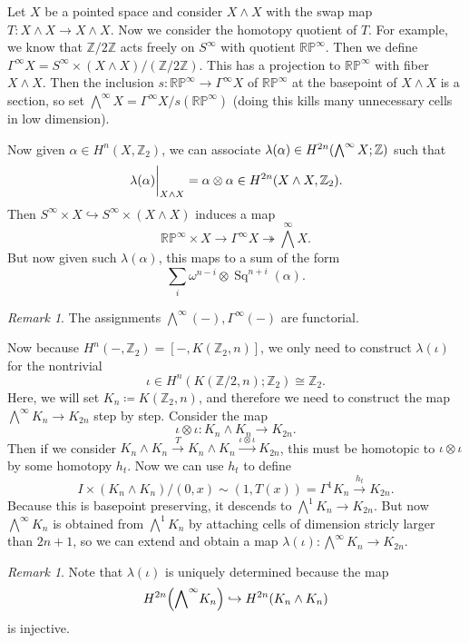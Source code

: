 \documentclass[leqno, openany]{memoir}
\theoremstyle{definition}
\theoremstyle{remark}
\newtheorem{rmk}[thm]{Remark}
\theoremstyle{plain}
\theoremstyle{definition}
\theoremstyle{remark}
\newcommand{\R}{\mathbb{R}}
\newcommand{\Z}{\mathbb{Z}}
\renewcommand{\P}{\mathbb{P}}
\DeclareMathOperator{\Sq}{Sq}
\begin{document}
Let $X$ be a pointed space and consider $X \wedge X$ with the swap map $T
\colon X \wedge X \to X \wedge X$. Now we consider the homotopy quotient of
$T$. For example, we know that $\Z/2\Z$ acts freely on $S^{\infty}$ with
quotient $\R\P^{\infty}$. Then we define $\Gamma^{\infty} X = S^{\infty} \times
(X \wedge X) / (\Z/2\Z)$. This has a projection to $\R\P^{\infty}$ with fiber
$X \wedge X$. Then the inclusion $s \colon \R\P^{\infty} \to \Gamma^{\infty} X$
of $\R\P^{\infty}$ at the basepoint of $X \wedge X$ is a section, so set
$\bigwedge^{\infty} X = \Gamma^{\infty} X / s(\R\P^{\infty})$ (doing this kills
many unnecessary cells in low dimension).

Now given $\alpha \in H^n(X, \Z_2)$, we can associate $\lambda(\alpha) \in
H^{2n}\qty(\bigwedge^{\infty} X; \Z)$ such that \[ \eval{\lambda(\alpha)}_{X
\wedge X} = \alpha \otimes \alpha \in H^{2n}(X \wedge X, \Z_2). \] Then
$S^{\infty} \times X \hookrightarrow S^{\infty} \times (X \wedge X)$ induces a
map \[ \R\P^{\infty} \times X \to \Gamma^{\infty} X \twoheadrightarrow
    {\bigwedge}^{\infty} X. \] But now given such $\lambda(\alpha)$, this maps
    to a sum of the form \[ \sum_i \omega^{n-i} \otimes \Sq^{n+i}(\alpha). \]

\begin{rmk} The assignments $\bigwedge^{\infty}(-), \Gamma^{\infty}(-)$ are
functorial.  \end{rmk}

Now because $H^n(-, \Z_2) = [-, K(\Z_2, n)]$, we only need to construct
$\lambda(\iota)$ for the nontrivial \[ \iota \in H^n(K(\Z/2, n); \Z_2) \cong
\Z_2. \] Here, we will set $K_n \coloneqq K(\Z_2, n)$, and therefore we need to
construct the map $\bigwedge^{\infty} K_n \to K_{2n}$ step by step. Consider
the map \[ \iota \otimes \iota \colon K_n \wedge K_n \to K_{2n}. \] Then if we
consider $K_n \wedge K_n \xrightarrow{T} K_n \wedge K_n \xrightarrow{\iota
\otimes \iota} K_{2n}$, this must be homotopic to $\iota \otimes \iota$ by some
homotopy $h_t$. Now we can use $h_t$ to define \[ I \times (K_n \wedge K_n) /
(0,x) \sim (1,T(x)) = \Gamma^1 K_n \xrightarrow{h_t} K_{2n}. \] Because this is
basepoint preserving, it descends to $\bigwedge^1 K_n \to K_{2n}$. But now
$\bigwedge^{\infty} K_n$ is obtained from $\bigwedge^1 K_n$ by attaching cells
of dimension stricly larger than $2n+1$, so we can extend and obtain a map
$\lambda(\iota) \colon \bigwedge^{\infty} K_n \to K_{2n}$.

\begin{rmk} Note that $\lambda(\iota)$ is uniquely determined because the map
    \[ H^{2n}\qty({ \bigwedge }^{\infty} K_n) \hookrightarrow H^{2n}(K_n \wedge
    K_n) \] is injective.  \end{rmk}
\end{document}

